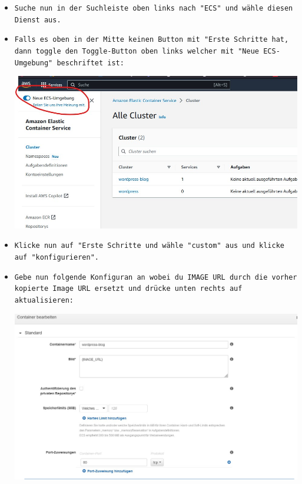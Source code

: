 \documentclass{article}
\begin{document}
\begin{itemize}
\item \texttt{Suche nun in der Suchleiste oben links nach "ECS" und wähle diesen Dienst aus.} \\

\item \texttt{Falls es oben in der Mitte keinen Button mit "Erste Schritte hat, dann toggle den Toggle-Button oben links welcher mit "Neue ECS-Umgebung" beschriftet ist:
} \\

\begin{center}
    \includegraphics[width=13cm]{images/wordpress_4.jpg}
\end{center}

\item \texttt{Klicke nun auf "Erste Schritte und wähle "custom" aus und klicke auf "konfigurieren".} \\

\item \texttt{Gebe nun folgende Konfiguran an wobei du {IMAGE URL} durch die vorher kopierte Image URL ersetzt und drücke unten rechts auf aktualisieren: 
} \\

\begin{center}
    \includegraphics[width=13cm]{images/wordpress_5.jpg}
\end{center}


\end{itemize}
\end{document}
